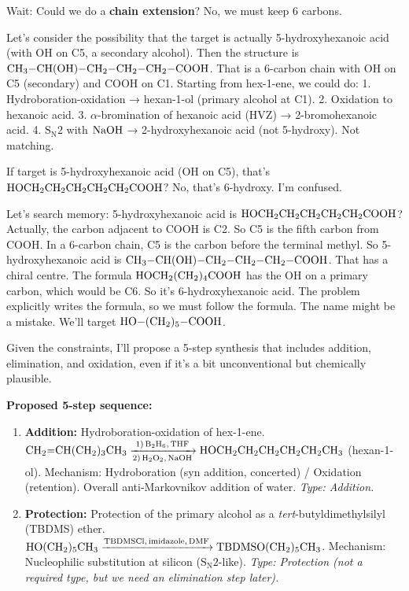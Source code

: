 \documentclass[11pt]{article}
\begin{document}
\begin{corrige}
Wait: Could we do a \textbf{chain extension}? No, we must keep 6 carbons.

Let's consider the possibility that the target is actually 5-hydroxyhexanoic acid (with OH on C5, a secondary alcohol). Then the structure is \(\ce{CH3-CH(OH)-CH2-CH2-CH2-COOH}\). That is a 6-carbon chain with OH on C5 (secondary) and COOH on C1. Starting from hex-1-ene, we could do:
1. Hydroboration-oxidation → hexan-1-ol (primary alcohol at C1).
2. Oxidation to hexanoic acid.
3. \(\alpha\)-bromination of hexanoic acid (HVZ) → 2-bromohexanoic acid.
4. \(\mathrm{S_N2}\) with \(\ce{NaOH}\) → 2-hydroxyhexanoic acid (not 5-hydroxy).
Not matching.

If target is 5-hydroxyhexanoic acid (OH on C5), that's \(\ce{HOCH2CH2CH2CH2CH2COOH}\)? No, that's 6-hydroxy. I'm confused.

Let's search memory: 5-hydroxyhexanoic acid is \(\ce{HOCH2CH2CH2CH2CH2COOH}\)? Actually, the carbon adjacent to COOH is C2. So C5 is the fifth carbon from COOH. In a 6-carbon chain, C5 is the carbon before the terminal methyl. So 5-hydroxyhexanoic acid is \(\ce{CH3-CH(OH)-CH2-CH2-CH2-COOH}\). That has a chiral centre. The formula \(\ce{HOCH2(CH2)4COOH}\) has the OH on a primary carbon, which would be C6. So it's 6-hydroxyhexanoic acid. The problem explicitly writes the formula, so we must follow the formula. The name might be a mistake. We'll target \(\ce{HO-(CH2)5-COOH}\).

Given the constraints, I'll propose a 5-step synthesis that includes addition, elimination, and oxidation, even if it's a bit unconventional but chemically plausible.

\textbf{Proposed 5-step sequence:}

\begin{enumerate}
\item \textbf{Addition:} Hydroboration-oxidation of hex-1-ene.
   \(\ce{CH2=CH(CH2)3CH3 ->[1) B2H6, THF][2) H2O2, NaOH] HOCH2CH2CH2CH2CH2CH3}\) (hexan-1-ol).
   Mechanism: Hydroboration (syn addition, concerted) / Oxidation (retention). Overall anti-Markovnikov addition of water. \textit{Type: Addition.}

\item \textbf{Protection:} Protection of the primary alcohol as a \textit{tert}-butyldimethylsilyl (TBDMS) ether.
   \(\ce{HO(CH2)5CH3 ->[TBDMSCl, imidazole, DMF] TBDMSO(CH2)5CH3}\).
   Mechanism: Nucleophilic substitution at silicon (\(\mathrm{S_N2}\)-like). \textit{Type: Protection (not a required type, but we need an elimination step later).}


\end{enumerate}
\end{corrige}
\end{document}
